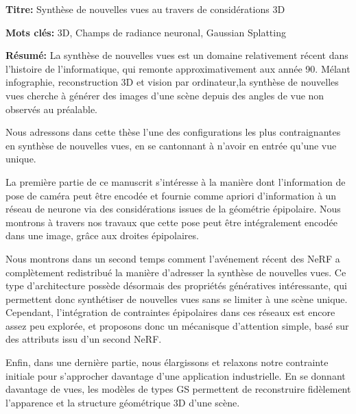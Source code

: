 \documentclass[french,12pt,a4paper]{book}
\begin{document}
\begin{mdframed}[linecolor=Prune,linewidth=1]

\textbf{Titre:} Synthèse de nouvelles vues au travers de considérations 3D

\noindent \textbf{Mots clés:} 3D, Champs de radiance neuronal, Gaussian Splatting

\vspace{-.5cm}
\begin{multicols}{2}
\noindent \textbf{Résumé:}
La synthèse de nouvelles vues est un domaine relativement récent dans l'histoire de l'informatique, qui remonte approximativement aux année 90. Mélant infographie, reconstruction 3D et vision par ordinateur,la synthèse de nouvelles vues cherche à générer des images d'une scène depuis des angles de vue non observés au préalable. 

Nous adressons dans cette thèse l'une des configurations les plus contraignantes en synthèse de nouvelles vues, en se cantonnant à n'avoir en entrée qu'une vue unique. 

La première partie de ce manuscrit s'intéresse à la manière dont l'information de pose de caméra peut être encodée et fournie comme apriori d'information à un réseau de neurone via des considérations issues de la géométrie épipolaire. Nous montrons à travers nos travaux que cette pose peut être intégralement encodée dans une image, grâce aux droites épipolaires. 

Nous montrons dans un second temps comment l'avénement récent des \ac{NeRF} a complètement redistribué la manière d'adresser la synthèse de nouvelles vues. Ce type d'architecture possède désormais des propriétés génératives intéressante, qui permettent donc synthétiser de nouvelles vues sans se limiter à une scène unique. Cependant, l'intégration de contraintes épipolaires dans ces réseaux est encore assez peu explorée, et proposons donc un mécanisque d'attention simple, basé sur des attributs issu d'un second \ac{NeRF}. 

Enfin, dans une dernière partie, nous élargissons et relaxons notre contrainte initiale pour s'approcher davantage d'une application industrielle. En se donnant davantage de vues, les modèles de types \ac{GS} permettent de reconstruire fidèlement l'apparence et la structure géométrique 3D d'une scène. 
\end{multicols}

\end{mdframed}

\vspace{8mm}
\end{document}
